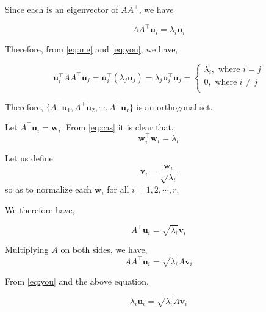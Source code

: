 \documentclass[a4paper]{article}
\begin{document}
Since each is an eigenvector of $AA^{\top}$, we have

\begin{equation}
AA^{\top}\boldsymbol{u}_i = \lambda_i \boldsymbol{u}_i 
\label{eq:you}
\end{equation}

Therefore, from \ref{eq:me} and \ref{eq:you}, we have,

\begin{equation}
\boldsymbol{u}_i^{\top}AA^{\top}\boldsymbol{u}_j  = \boldsymbol{u}_i^{\top} \left( \lambda_j \boldsymbol{u}_j \right) = \lambda_j \boldsymbol{u}_i^{\top} \boldsymbol{u}_j = \begin{cases}
\lambda_i, \text{ where } i = j \\
0, \text{ where } i \neq j\\
\end{cases}
\label{eq:cas}
\end{equation}

Therefore, $\{ A^{\top}\boldsymbol{u}_1, A^{\top}\boldsymbol{u}_2, \cdots, A^{\top}\boldsymbol{u}_r \}$ is an orthogonal set.

Let $A^{\top}\boldsymbol{u}_i = \boldsymbol{w}_i$. From \ref{eq:cas} it is clear that, 
\begin{equation}
\boldsymbol{w}_i^{\top} \boldsymbol{w}_i = \lambda_i
\end{equation}

Let us define \begin{equation}
\boldsymbol{v}_i = \frac{\boldsymbol{w}_i}{\sqrt{\lambda_{i}} }
\end{equation} so as to normalize each $\boldsymbol{w}_i$ for all $i=1,2,\cdots,r$.

We therefore have,

\begin{equation}
A^{\top} \boldsymbol{u}_i = \sqrt{\lambda_{i}} \boldsymbol{v}_i
\end{equation}

Multiplying $A$ on both sides, we have,
\begin{equation}
AA^{\top} \boldsymbol{u}_i = \sqrt{\lambda_{i}} A\boldsymbol{v}_i
\end{equation}

From \ref{eq:you} and the above equation,

\begin{equation}
\lambda_i \boldsymbol{u}_i = \sqrt{\lambda_{i}} A\boldsymbol{v}_i
\end{equation}
\end{document}
